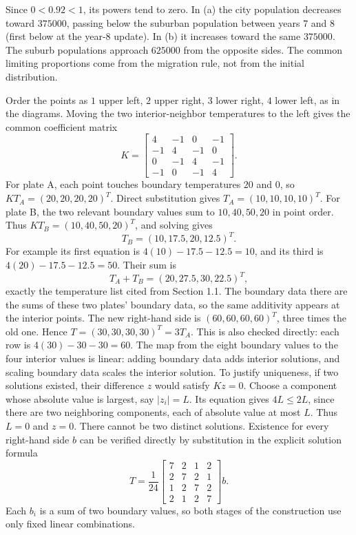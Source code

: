 Since $0<0.92<1$, its powers tend to zero. In (a) the city
population decreases toward $375000$, passing below the suburban
population between years $7$ and $8$ (first below at the year-$8$ update).
In (b) it increases toward the same
$375000$. The suburb populations approach $625000$ from the
opposite sides. The common limiting proportions come from the
migration rule, not from the initial distribution.

Order the points as $1$ upper left, $2$ upper right, $3$ lower right,
$4$ lower left, as in the diagrams. Moving the two interior-neighbor
temperatures to the left gives the common coefficient matrix
\[
 K=\begin{bmatrix}4&-1&0&-1\\-1&4&-1&0\\0&-1&4&-1\\-1&0&-1&4\end{bmatrix}.
\]
For plate A, each point touches boundary temperatures $20$ and $0$,
so $KT_A=(20,20,20,20)^T$. Direct substitution gives
$T_A=(10,10,10,10)^T$.
For plate B, the two relevant boundary values sum to $10,40,50,20$
in point order. Thus $KT_B=(10,40,50,20)^T$, and solving gives
\[
 T_B=(10,17.5,20,12.5)^T.
\]
For example its first equation is $4(10)-17.5-12.5=10$,
and its third is $4(20)-17.5-12.5=50$.
Their sum is
\[
 T_A+T_B=(20,27.5,30,22.5)^T,
\]
exactly the temperature list cited from Section 1.1. The boundary
data there are the sums of these two plates' boundary data, so the
same additivity appears at the interior points.
The new right-hand side is $(60,60,60,60)^T$, three times the
old one. Hence $T=(30,30,30,30)^T=3T_A$. This is also
checked directly: each row is $4(30)-30-30=60$.
The map from the eight boundary values to the four interior values
is linear: adding boundary data adds interior solutions, and scaling
boundary data scales the interior solution. To justify uniqueness,
if two solutions existed, their difference $z$ would satisfy $Kz=0$.
Choose a component whose absolute value is largest, say $|z_i|=L$.
Its equation gives $4L\le2L$, since there are two neighboring
components, each of absolute value at most $L$. Thus $L=0$ and
$z=0$. There cannot be two distinct solutions.
Existence for every right-hand side $b$ can be verified directly by
substitution in the explicit solution formula
\[
 T=\frac1{24}
 \begin{bmatrix}7&2&1&2\\2&7&2&1\\1&2&7&2\\2&1&2&7\end{bmatrix}b.
\]
Each $b_i$ is a sum of two boundary values, so both stages of the
construction use only fixed linear combinations.
